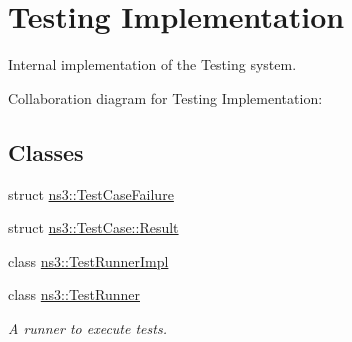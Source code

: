 \hypertarget{group__testingimpl}{}\section{Testing Implementation}
\label{group__testingimpl}


Internal implementation of the Testing system.  


Collaboration diagram for Testing Implementation\+:
\subsection*{Classes}
\begin{DoxyCompactItemize}
\item 
struct \hyperlink{structns3_1_1TestCaseFailure}{ns3\+::\+Test\+Case\+Failure}
\item 
struct \hyperlink{structns3_1_1TestCase_1_1Result}{ns3\+::\+Test\+Case\+::\+Result}
\item 
class \hyperlink{classns3_1_1TestRunnerImpl}{ns3\+::\+Test\+Runner\+Impl}
\item 
class \hyperlink{classns3_1_1TestRunner}{ns3\+::\+Test\+Runner}
\begin{DoxyCompactList}\small\item\em A runner to execute tests. \end{DoxyCompactList}\end{DoxyCompactItemize}
